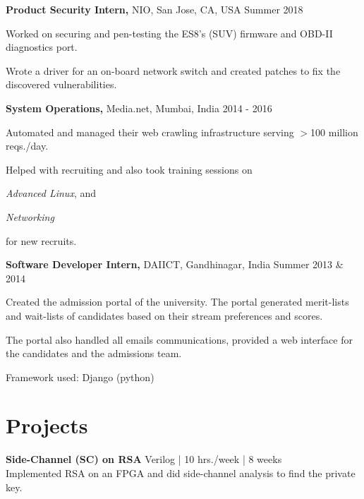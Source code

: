 \documentclass[margin]{res}
\newcommand{\daiict}{\textsc{DAIICT}}
\begin{document}
\begin{resume}
{\bf Product Security Intern,} NIO, San Jose, CA, USA
\hfill Summer 2018 %
\begin{itemizeexp}
    \item Worked on securing and pen-testing the ES8's (SUV) firmware and
    OBD-II diagnostics port.
    \item Wrote a driver for an on-board network switch and created patches
    to fix the discovered vulnerabilities.
\end{itemizeexp}

{\bf System Operations,} Media.net, Mumbai, India
\hfill 2014 - 2016 %
\begin{itemizeexp}
    \item Automated and managed their web crawling infrastructure serving
    $>$100 million reqs./day.
    \item Helped with recruiting and also took training sessions on 
    \begin{enumerate*}[label=(\roman*)]
      \item \textit{Advanced Linux}, and
      \item \textit{Networking}
    \end{enumerate*}
    for new recruits.
\end{itemizeexp}

{\bf Software Developer Intern,} \daiict, Gandhinagar, India
\hfill Summer 2013 \& 2014 %
\begin{itemizeexp}
    \item Created the admission portal of the university. The portal generated
    merit-lists and wait-lists of candidates based on their stream preferences
    and scores. 
    \item The portal also handled all emails communications, provided a
    web interface for the candidates and the admissions team.
    \item Framework used: Django (python)
\end{itemizeexp}

\section{Projects}
{\bfseries Side-Channel (SC) on RSA}\hfill
{\small Verilog | 10 hrs./week | 8 weeks}\\
Implemented RSA on an FPGA and did side-channel analysis to find the private key.\\[2ex]


\end{resume}
\end{document}
